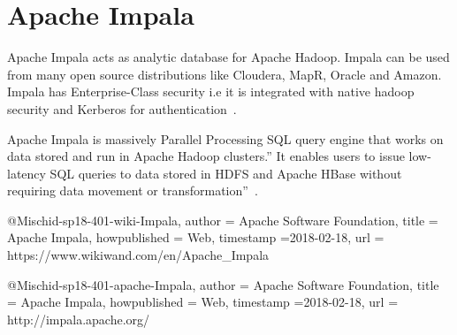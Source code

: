 \section{Apache Impala}

Apache Impala acts as analytic database for Apache Hadoop. Impala can be used
from many open source distributions like Cloudera, MapR, Oracle and Amazon.
Impala has Enterprise-Class security i.e it is integrated with native hadoop
security and Kerberos for authentication~\cite{hid-sp18-401-wiki-Impala}.

Apache Impala is massively Parallel Processing SQL query engine that works on
data stored and run in Apache Hadoop clusters.” It enables users to issue low-
latency SQL queries to data stored in HDFS and Apache HBase without requiring
data movement or transformation”~\cite{hid-sp18-401-apache-Impala}.


@Misc{hid-sp18-401-wiki-Impala,        
author = {Apache Software Foundation},
title = {Apache Impala},        
howpublished = {Web},        
timestamp ={2018-02-18},        
url = {https://www.wikiwand.com/en/Apache_Impala} }

@Misc{hid-sp18-401-apache-Impala,        
author = {Apache Software Foundation},
title  = {Apache Impala},        
howpublished = {Web},        
timestamp ={2018-02-18},        
url = {http://impala.apache.org/} }

